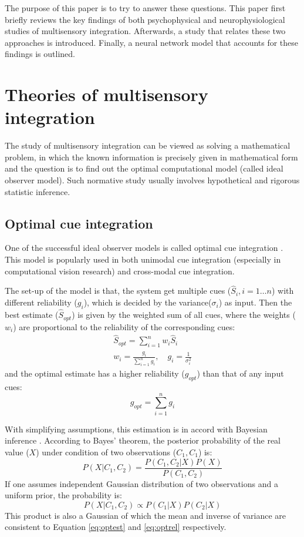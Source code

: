 \documentclass{article}[11pt]
\begin{document}
The purpose of this paper is to try to answer these questions. This paper first briefly reviews the key findings of both psychophysical and neurophysiological studies of multisensory integration. Afterwards, a study that relates these two approaches is introduced. Finally, a neural network model that accounts for these findings is outlined.

\section{Theories of multisensory integration}
The study of multisensory integration can be viewed as solving a mathematical problem, in which the known information is precisely given in mathematical form and the question is to find out the optimal computational model (called ideal observer model). Such normative study usually involves hypothetical and rigorous statistic inference.

\subsection{Optimal cue integration}
One of the successful ideal observer models is called optimal cue integration \cite{geisler_contributions_2011}. This model is popularly used in both unimodal cue integration (especially in computational vision research) and cross-modal cue integration.

The set-up of the model is that, the system get multiple cues ($\hat{S}_i, i=1 \dots n$) with different reliability ($g_i$), which is decided by the variance($\sigma_i$) as input. Then the best estimate ($\hat{S}_{opt}$) is given by the weighted sum of all cues, where the weights ($w_i$) are proportional to the reliability of the corresponding cues:
\begin{gather}
  \hat{S}_{opt} = \sum_{i=1}^{n} w_i \hat{S}_i \label{eq:optest} \\
  w_i = \frac{g_i}{\sum_{i=1}^{n} g_i}, \quad g_i = \frac{1}{\sigma_i^2} \label{eq:optweight}
\end{gather}
and the optimal estimate has a higher reliability ($g_{opt}$) than that of any input cues:
\begin{equation}
  g_{opt} = \sum_{i=1}^{n} g_i \label{eq:optrel}
\end{equation}

With simplifying assumptions, this estimation is in accord with Bayesian inference \cite{knill_bayesian_2004}. According to Bayes' theorem, the posterior probability of the real value ($X$) under condition of two observations ($C_1, C_1$) is:
\begin{equation}
  P(X|C_1,C_2) = \frac{P(C_1,C_2|X)P(X)}{P(C_1,C_2)}
\end{equation}
If one assumes independent Gaussian distribution of two observations and a uniform prior, the probability is:
\begin{equation}
  P(X|C_1,C_2) \propto P(C_1|X)P(C_2|X)
\end{equation}
This product is also a Gaussian of which the mean and inverse of variance are consistent to Equation \ref{eq:optest} and \ref{eq:optrel} respectively.
\end{document}

